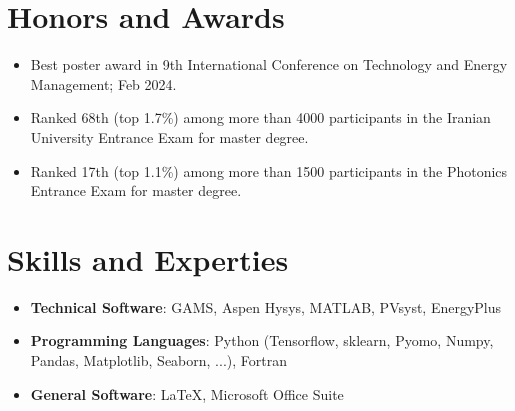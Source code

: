 \documentclass[letter,20pt]{article}
\begin{document}
\section{Honors and Awards}	    
\vspace{5pt}

\begin{itemize}[noitemsep, topsep=6pt, after=\vspace{-5 mm}, leftmargin = 3ex]
	\item \small Best poster award in 9th International Conference on Technology and Energy Management; Feb 2024. \vspace{5pt}
    \item \small Ranked 68th (top 1.7\%) among more than 4000 participants in the Iranian University Entrance Exam for master degree. \vspace{5pt}
    \item \small Ranked 17th (top 1.1\%) among more than 1500 participants in the Photonics Entrance Exam for master degree. \vspace{5pt}
    
	
\end{itemize}
\vspace{0pt}

\section{Skills and Experties}	    
\vspace{5pt}
    \begin{itemize}[noitemsep, topsep=6pt, after=\vspace{-5 mm}, leftmargin = 3ex]
        \item \small \textbf{Technical Software}: GAMS, Aspen Hysys, MATLAB, PVsyst, EnergyPlus\vspace{5pt}
        \item \small \textbf{Programming Languages}: Python (Tensorflow, sklearn,  Pyomo, Numpy, Pandas,  Matplotlib, Seaborn, ...), Fortran\vspace{5pt}
	    \item \small \textbf{General Software}: \LaTeX, Microsoft Office Suite \vspace{5pt}
     
\end{itemize}
\vspace{0pt}
\end{document}
